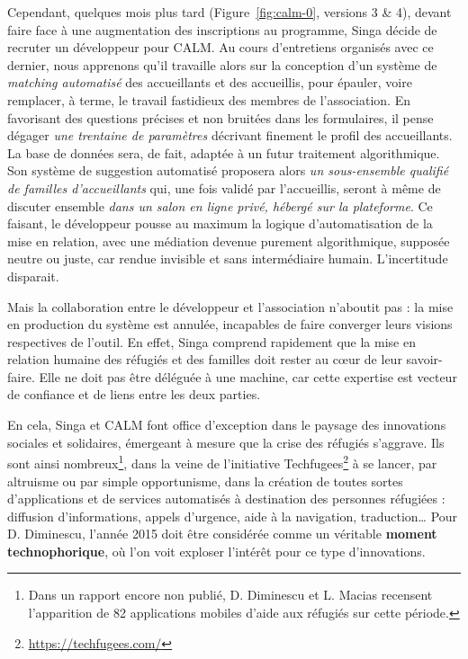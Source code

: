 \documentclass[symmetric,justified,marginals=raggedouter]{tufte-book}
\begin{document}
Cependant, quelques mois plus tard (Figure~\ref{fig:calm-0}, versions 3 \& 4), devant faire face à une augmentation des inscriptions au programme, Singa décide de recruter un dévelop\-peur pour CALM. Au cours d'entre\-tiens organisés avec ce dernier, nous apprenons qu'il travaille alors sur la conception d'un système de \og\textit{matching automatisé}\fg{} des accueillants et des accueillis, pour épauler, voire remplacer, à terme, le travail fastidieux des membres de l'association. En favorisant des questions précises et non bruitées dans les formulaires, il pense dégager \og\textit{une trentaine de paramètres}\fg{} décrivant finement le profil des accueillants. La base de données sera, de fait, adaptée à un futur traitement algorithmique. Son système de suggestion automatisé proposera alors \og\textit{un sous-ensemble qualifié de familles d'accueil\-lants} qui, une fois validé par l'accueillis, seront à même de discuter ensemble \og\textit{dans un salon en ligne privé, hébergé sur la plateforme}\fg{}. Ce faisant, le développeur pousse au maximum la logique d'automatisation de la mise en relation, avec une médiation devenue purement algorithmique, supposée neutre ou juste, car rendue invisible et sans intermédiaire humain. L'incertitude disparait. 

Mais la collaboration entre le développeur et l'association n'aboutit pas : la mise en production du système est annulée, incapables de faire converger leurs visions respectives de l'outil. En effet, Singa comprend rapidement que la mise en relation humaine des réfugiés et des familles doit rester au cœur de leur savoir-faire. Elle ne doit pas être déléguée à une machine, car cette expertise est vecteur de confiance et de liens entre les deux parties. 

En cela, Singa et CALM font office d'exception dans le paysage des innovations sociales et solidaires, émergeant à mesure que la crise des réfugiés s'aggrave. Ils sont ainsi nombreux\footnote{\RaggedOuter Dans un rapport encore non publié, D. Diminescu et L. Macias recensent l'apparition de 82 applications mobiles d'aide aux réfugiés sur cette période.}, dans la veine de l'initiative Techfugees\footnote{\RaggedOuter \url{https://techfugees.com/}} à se lancer, par altruisme ou par simple opportunisme, dans la création de toutes sortes d'applications et de services automatisés à destination des personnes réfugiées : diffusion d'informations, appels d'urgence, aide à la navigation, traduction\ldots{} Pour D. Diminescu, l'année 2015 doit être considérée comme un véritable \textbf{moment technophorique}, où l'on voit exploser l'intérêt pour ce type d'innovations.
\end{document}
